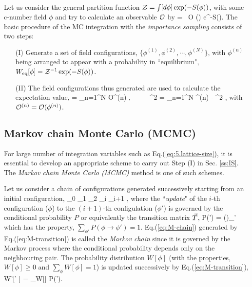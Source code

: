      Let us consider the general partition function ${\cal Z}= \int [d\phi] \exp(-S(\phi)) $,
    with some c-number field $\phi$  and try to calculate  an observable ${\cal O} $ by
  \beq
   \rangle =  \int [d \phi] \ {\cal O} (\phi) e^{-S(\phi)}.
  \eeq   
  The basic procedure of the MC integration
  with the {\it importance sampling} consists of two steps:
  \begin{enumerate}
  \item[(I)]   Generate a set of field configurations, $ \{  \phi^{(1)}, \phi^{(2)}, \cdots, \phi^{(N)} \}$, 
with $\phi^{(n)}$  being arranged to appear with 
 a probability in ``equilibrium", $W_{\rm eq}[\phi]={\cal Z}^{-1} \exp (-S(\phi))$.
 \item[(II)]  The field configurations thus generated 
 are  used to calculate the expectation value,
 \beq
\label{eq:5.obs-average}
 \ra = \sum_{n=1}^N {\cal O}^{(n)}
\pm {}, \ \ \ \ \ 
\sigma^2 =   \sum_{n=1}^N ^{(n)} -  \ra \ra^2 ,
\eeq
with ${\cal O}^{(n)}={\cal O}(\phi^{(n)})$.
\end{enumerate}

\subsection{Markov chain Monte Carlo (MCMC)}
  
 For large  number of integration variables such as Eq.(\ref{eq:5.lattice-size}), 
 it  is essential to develop an appropriate scheme to carry out  Step (I) in Sec. \ref{ss:IS}. 
 The {\it Markov chain Monte Carlo (MCMC)}  method is one of such schemes. 
    
Let us consider a chain of configurations  generated successively starting from an
initial configuration,
\beq
\label{eq:M-chain}
 \phi_{0} \rightarrow  \phi_{1} \rightarrow \phi_{2}
 \rightarrow \cdots \rightarrow \phi_{i} \rightarrow  \phi_{i+1}
\rightarrow \cdots ,  
\eeq
where the ``{\it update}" of the $i$-th configuration ($\phi$)  to
the $(i+1)$-th configulation ($\phi'$)  is governed by the conditional probability
$P$ or equivalently  the transition matrix $\vec{T}$, 
\beq
\label{eq:M-transition}
P(\phi \rightarrow \phi') = (\vT)_{\phi \phi'} 
\eeq
which has the property, $\sum_{\phi'} P(\phi \rightarrow \phi')=1$.
Eq.(\ref{eq:M-chain}) generated by Eq.(\ref{eq:M-transition}) is called the {\it Markov chain} since
it is governed by the Markov process where the conditional probability depends only on the 
neighbouring pair. The probability distribution $W[\phi]$ (with the properties, $W[\phi] \ge 0$ and 
$\sum_{\phi} W[\phi]=1$) is updated successively by Eq.(\ref{eq:M-transition}),
\beq
\label{eq:5.MC-update}
W'[\phi' ] =  \sum_\phi  W[\phi] P(\phi \rightarrow \phi'). 
\eeq

